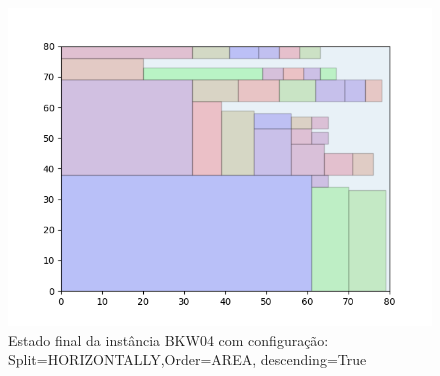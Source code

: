 \begin{figure}[H]
    \centering
    \caption[]{Estado final da instância BKW04 com configuração: Split=HORIZONTALLY,Order=AREA, descending=True}
    \label{fig:bkw04-horizontally-area-true}
    \includegraphics[scale=0.5]{output/figures/bkw/bkw04/horizontally/area/true/00}
\end{figure}